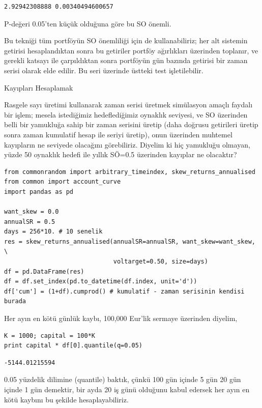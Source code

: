 \documentclass[12pt,fleqn]{article}\usepackage{../../common}
\begin{document}
\begin{verbatim}
2.92942308888 0.00340494600657
\end{verbatim}

P-değeri 0.05'ten küçük olduğuna göre bu SO önemli.

Bu tekniği tüm portföyün SO önemliliği için de kullanabiliriz; her alt sistemin
getirisi hesaplandıktan sonra bu getiriler portföy ağırlıkları üzerinden
toplanır, ve gerekli katsayı ile çarpıldıktan sonra portföyün gün bazında
getirisi bir zaman serisi olarak elde edilir. Bu seri üzerinde üstteki test
işletilebilir.

Kayıpları Hesaplamak

Rasgele sayı üretimi kullanarak zaman serisi üretmek simülasyon amaçlı faydalı
bir işlem; mesela istediğimiz hedeflediğimiz oynaklık seviyesi, ve SO üzerinden
belli bir yamukluğa sahip bir zaman serisini üretip (daha doğrusu getirileri
üretip sonra zaman kumulatif hesap ile seriyi üretip), onun üzerinden muhtemel
kayıpların ne seviyede olacağını görebiliriz. Diyelim ki hiç yamukluğu olmayan,
yüzde 50 oynaklık hedefi ile yıllık SÖ=0.5 üzerinden kayıplar ne olacaktır?

\begin{verbatim}
from commonrandom import arbitrary_timeindex, skew_returns_annualised
from common import account_curve
import pandas as pd

want_skew = 0.0
annualSR = 0.5
days = 256*10. # 10 senelik
res = skew_returns_annualised(annualSR=annualSR, want_skew=want_skew, \
                              voltarget=0.50, size=days) 
df = pd.DataFrame(res)
df = df.set_index(pd.to_datetime(df.index, unit='d'))
df['cum'] = (1+df).cumprod() # kumulatif - zaman serisinin kendisi burada
\end{verbatim}

Her ayın en kötü günlük kaybı, 100,000 Eur'lik sermaye üzerinden diyelim,

\begin{verbatim}
K = 1000; capital = 100*K
print capital * df[0].quantile(q=0.05)
\end{verbatim}

\begin{verbatim}
-5144.01215594
\end{verbatim}

0.05 yüzdelik dilimine (quantile) baktık, çünkü 100 gün içinde 5 gün 20 gün
içinde 1 gün demektir, bir ayda 20 iş günü olduğunu kabul edersek her ayın en
kötü kaybını bu şekilde hesaplayabiliriz.
\end{document}
